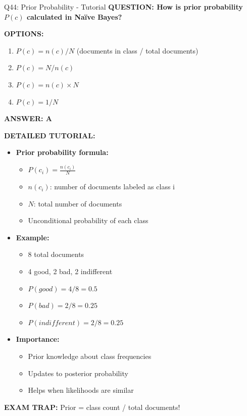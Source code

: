 \documentclass[8pt]{beamer}
\begin{document}
	\begin{frame}{Q44: Prior Probability - Tutorial}
		\fontsize{6.5}{7.5}\selectfont
		\textbf{QUESTION: How is prior probability $P(c)$ calculated in Naïve Bayes?}
		
		\vspace{0.1cm}
		\textbf{OPTIONS:}
		\begin{enumerate}
			\item $P(c) = n(c) / N$ (documents in class / total documents)
			\item $P(c) = N / n(c)$
			\item $P(c) = n(c) \times N$
			\item $P(c) = 1 / N$
		\end{enumerate}
		
		\vspace{0.1cm}
		\textcolor{myblue}{\textbf{ANSWER: A}}
		
		\vspace{0.1cm}
		\textbf{DETAILED TUTORIAL:}
		\begin{itemize}
			\item \textbf{Prior probability formula:}
			\begin{itemize}
				\item $P(c_i) = \frac{n(c_i)}{N}$
				\item $n(c_i)$: number of documents labeled as class i
				\item $N$: total number of documents
				\item Unconditional probability of each class
			\end{itemize}
			\item \textbf{Example:}
			\begin{itemize}
				\item 8 total documents
				\item 4 good, 2 bad, 2 indifferent
				\item $P(good) = 4/8 = 0.5$
				\item $P(bad) = 2/8 = 0.25$
				\item $P(indifferent) = 2/8 = 0.25$
			\end{itemize}
			\item \textbf{Importance:}
			\begin{itemize}
				\item Prior knowledge about class frequencies
				\item Updates to posterior probability
				\item Helps when likelihoods are similar
			\end{itemize}
		\end{itemize}
		
		\textcolor{myred}{\textbf{EXAM TRAP:}} Prior = \textcolor{myblue}{class count / total documents}!
	\end{frame}
	
\end{document}
